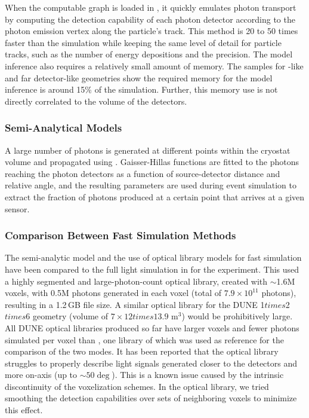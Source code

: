\documentclass[../main-v1.tex]{subfiles}
\begin{document}
When the computable graph is loaded in , it quickly emulates photon transport by  computing the %
detection capability of each photon detector according to the photon emission vertex along the particle's track.
This method is 20 to 50 times faster than the  simulation while keeping the same level of detail for particle tracks, such as the number of energy depositions and the precision.
The model inference also requires a relatively small amount of memory. The samples for -like and %
far detector-like geometries show the required memory for the model inference is around 15\% of the  simulation. Further, this memory use is not directly correlated to the volume of the detectors. 

\subsubsection{Semi-Analytical Models}
A large number of photons is generated at different points within the cryostat volume and propagated using . Gaisser-Hillas functions are fitted to the %
photons reaching the photon detectors as a function of source-detector distance and relative angle, and the resulting parameters are used during event simulation %
to extract the fraction of photons produced at a certain point that arrives at a given sensor.
 
\subsubsection{Comparison Between Fast Simulation Methods}
The semi-analytic model and the use of  optical library models for fast simulation have been compared to the full light simulation in  for the  experiment. This used a highly segmented and large-photon-count optical library, created with $\sim$1.6M voxels, with 0.5M photons %
generated in each voxel (total of $7.9 \times  10^{11}$ photons), resulting in a  1.2\,GB file size. A similar optical library for the DUNE 1$times$2$times$6 geometry (volume of $7 \times 12 times 13.9$ m$^3$) would be prohibitively large.
All DUNE optical libraries produced so far have larger voxels and fewer photons simulated per voxel %
than , one library of which  was used as reference for the comparison of the two modes. It has been reported that the optical library struggles to properly describe light signals generated closer to the detectors and more on-axis (up to $\sim50\deg$). This is a known issue caused by the intrinsic discontinuity of the voxelization schemes. In the  optical library, %
we tried smoothing the detection capabilities over sets of neighboring voxels to minimize this effect.
\end{document}
